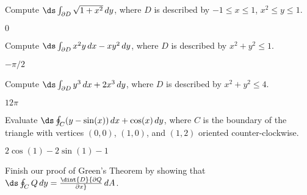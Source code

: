 \begin{exercises}
\exercise Compute $\ds\int_{\partial D} \sqrt{1+x^2}\,dy$, 
where $D$ is described by $-1\le x\le 1$, $x^2\le y\le 1$.
\begin{answer} $0$
\end{answer}

\exercise Compute $\ds\int_{\partial D} x^2y\,dx - xy^2\,dy$, 
where $D$ is described by $x^2+y^2\le 1$.
\begin{answer} $-\pi/2$
\end{answer}

\exercise Compute $\ds\int_{\partial D} y^3\,dx + 2x^3\,dy$, 
where $D$ is described by $x^2+y^2\le 4$.
\begin{answer} $12\pi$
\end{answer}


\exercise Evaluate $\ds\oint_C (y-\sin(x))\,dx + \cos(x) \, dy$,
where $C$ is the boundary of the triangle with vertices $(0,0)$,
$(1,0)$, and $(1,2)$ oriented counter-clockwise.
\begin{answer} $2\cos(1)-2\sin(1)-1$
\end{answer}
\exercise Finish our proof of Green's Theorem by showing that
$\ds\oint_C Q\,dy=\dint{D} {\partial Q\over\partial x}\,dA$.

\end{exercises}
